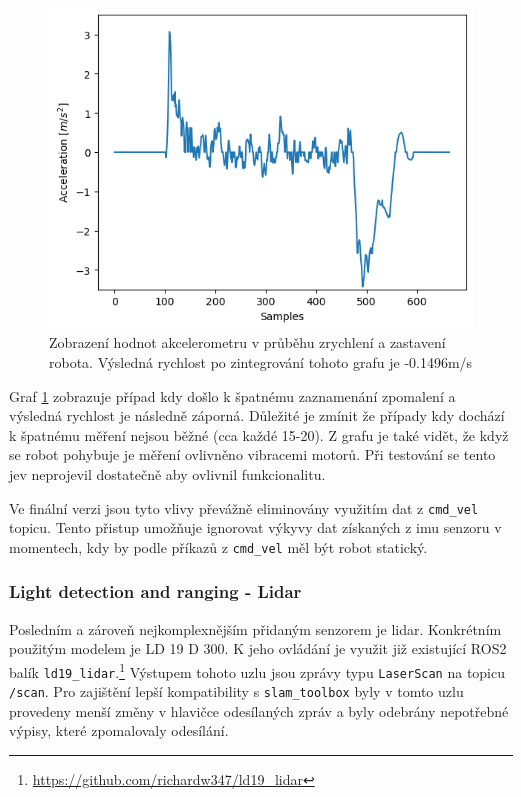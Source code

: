 \begin{figure}[h!]
	\centering
	\includegraphics[scale=0.75]{obrazky-figures/accelerometer_graph.png}
	\caption[Graf výstupních hodnot akcelerometru]{Zobrazení hodnot akcelerometru v průběhu zrychlení a zastavení robota. Výsledná rychlost po zintegrování tohoto grafu je -0.1496m/s}
	\label{fig:accel_readings}
\end{figure}
Graf \ref{fig:accel_readings} zobrazuje případ kdy došlo k špatnému zaznamenání zpomalení a výsledná rychlost je následně záporná. Důležité je zmínit že případy kdy dochází k špatnému měření nejsou běžné (cca každé 15-20). Z grafu je také vidět, že když se robot pohybuje je měření ovlivněno vibracemi motorů. Při testování se tento jev neprojevil dostatečně aby ovlivnil funkcionalitu.

Ve finální verzi jsou tyto vlivy převážně eliminovány využitím dat z \verb|cmd_vel| topicu. Tento přistup umožňuje ignorovat výkyvy dat získaných z imu senzoru v momentech, kdy by podle příkazů z \verb|cmd_vel| měl být robot statický.

\subsubsection*{Light detection and ranging - Lidar}
Posledním a zároveň nejkomplexnějším přidaným senzorem je lidar. Konkrétním použitým modelem je LD 19 D 300. K jeho ovládání je využit již existující ROS2 balík \verb|ld19_lidar|.\footnote{\url{https://github.com/richardw347/ld19_lidar}} Výstupem tohoto uzlu jsou zprávy typu \verb|LaserScan| na topicu \verb|/scan|. Pro zajištění lepší kompatibility s \verb|slam_toolbox| byly v tomto uzlu provedeny menší změny v hlavičce odesílaných zpráv a byly odebrány nepotřebné výpisy, které zpomalovaly odesílání.

